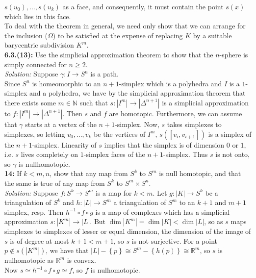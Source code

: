 \documentclass[a4paper]{article}
\begin{document}
$s(u_0), \ldots, s(u_k)$ as a face, and consequently, it must contain the
point $s(x)$ which lies in this face.\\
\linebreak
To deal with the theorem in general, we need only show that we can arrange
for the inclusion ($\Omega$) to be satisfied at the expense of replacing
$K$ by a suitable barycentric subdivision $K^{m}$.\\
\linebreak
\textbf{6.3.(13):} Use the simplicial approximation theorem to show that the
$n$-sphere is simply connected for $n\ge 2$.\\
\linebreak
\textit{Solution:}
Suppose $\gamma  \colon I \to S^{n}$ is a path.\\
Since $S^{n}$ is homeomorphic to an $n+1$-simplex which is a polyhedra and
$I$ is a $1$-simplex and a polyhedra, we have by the simplicial approximation
theorem that there exists some $m \in \mathbb{N}$ such that
$s  \colon \left| I^{m} \right| \to \left| \Delta^{n+1} \right| $ is a simplicial
approximation to $f  \colon \left| I^{m} \right| \to  \left| \Delta^{n+1}
\right|$. Then $s$ and $f$ are homotopic. Furthermore, we can assume that
$\gamma$ starts at a vertex of the $n+1$-simplex. Now, $s$ takes simplexes to
simplexes, so letting $v_0, \ldots, v_k$ be the vertices of $I^{m}$,
$s\left( \left[ v_i, v_{i+1} \right]  \right) $ is a simplex of
the $n+1$-simplex. Linearity of $s$ implies that the simplex is of dimension
$0$ or $1$, i.e. $s$ lives completely on $1$-simplex faces of the
$n+1$-simplex. Thus  $s$ is not onto, so
$\gamma$ is nullhomotopic.\\
\linebreak
\textbf{14:} If $k < m,n$, show that any map from
$S^{k}$ to $S^{m}$ is null homotopic, and that the same is true of any map from
$S^{k}$ to $S^{m} \times S^{n}$.\\
\linebreak
\textit{Solution:} 
Suppose $f  \colon S^{k} \to S^{m}$ is a map for $k<m$. 
Let $g  \colon \left| K \right| \to 
S^{k}$ be a triangulation of $S^{k}$ and
$h  \colon \left| L \right| \to 
S^{m}$ a triangulation of $S^{m}$ to an $k+1$ and $m+1$ simplex, resp. Then
$h^{-1} \circ f \circ g$ is a map of complexes which has a simplicial
approximation
$s  \colon \left| K^{m} \right| 
\to \left| L \right| $.
But $\dim \left| K^{m} \right| = \dim \left| K \right| 
< \dim \left| L \right| $, so as $s$ maps simplexes to simplexes of lesser or
equal dimension, the dimension of the image of $s$ is of degree at most
$k+1 < m+1$, so $s$ is not surjective. For a point
$p \not\in s \left( \left| K^{m} \right|  \right) $, we have that
$\left| L \right| - \left\{ p \right\} 
\cong S^{m} - \left\{ h(p) \right\} 
\cong \mathbb{R}^{m}$, so
$s$ is nulhomotopic as $\mathbb{R}^{m}$ is convex.\\
Now $s \simeq h^{-1} \circ f \circ g \simeq f$, so
$f$ is nulhomotopic.
\end{document}
